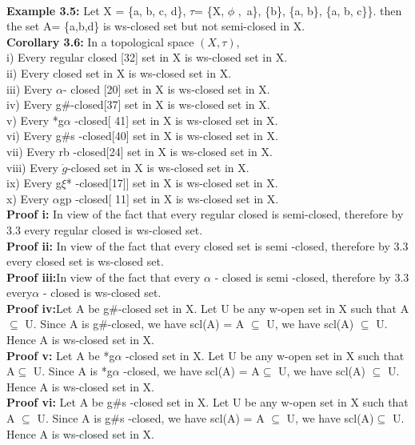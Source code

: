 	\\\textbf{Example 3.5:} Let X = \{a, b, c, d\},   $\tau$= \{X, $\phi$ ,\ {a\}, \{b\}, \{a, b\}, \{a, b, c\}\}.  then the set  A= \{a,b,d\} is ws-closed set but not semi-closed in X.
		\\\textbf{Corollary 3.6:} In a topological space $(X,\tau)$,
		\\i)	Every regular closed [32] set in X  is ws-closed set in X.
		\\ii)	Every  closed  set in X  is ws-closed set in X.
		\\iii)	Every  $\alpha$- closed [20] set in X  is ws-closed set in X.
		\\iv)	Every g$\#$-closed[37] set in X  is ws-closed set in X.
		\\v)	Every *g$\alpha$ -closed[ 41] set in X  is ws-closed set in X.
		\\vi)	Every g$\#$s -closed[40] set in X  is ws-closed set in X.
		\\vii)	Every rb -closed[24]  set in X  is ws-closed set in X.
		\\viii)	Every  $\ddot{g}$-closed set in X  is ws-closed set in X.
		\\ix)	Every g$\xi$* -closed[17]] set in X  is ws-closed set in X.
		\\x)	Every $\alpha$gp -closed[ 11]  set in X  is ws-closed set in X.
		\\\textbf{Proof i: } In view of the fact that every regular closed is  semi-closed, therefore  by 3.3 every regular closed is ws-closed set.
		\\\textbf{Proof ii:} In view of the fact that every  closed set is  semi -closed, therefore  by 3.3  every closed set  is ws-closed set.
		\\\textbf{Proof iii:}In view of the fact that  every $\alpha$ - closed is  semi -closed, therefore  by 3.3 every$\alpha$ - closed is ws-closed set.
		\\\textbf{Proof iv:}Let A be g$\#$-closed set in X. Let U be any w-open set in X such that A $\subseteq$ U. Since A is g$\#$-closed, we have scl(A) = A $\subseteq$ U, we have  scl(A) $\subseteq$ U.   Hence A is ws-closed set in X.
		\\\textbf{Proof v:}  Let A be *g$\alpha$ -closed set in X. Let U be any w-open set in X such that A$\subseteq$ U. Since A is *g$\alpha$ -closed, we have scl(A) = A$\subseteq$ U, we have  scl(A) $\subseteq$ U.   Hence A is ws-closed set in X.
		\\\textbf{Proof vi: } Let A be g$\#$s -closed set in X. Let U be any w-open set in X such that  A $\subseteq$ U. Since A is g$\#$s -closed, we have scl(A) = A $\subseteq$ U, we have  scl(A)$\subseteq$ U.   Hence A is ws-closed   set in X.
}
